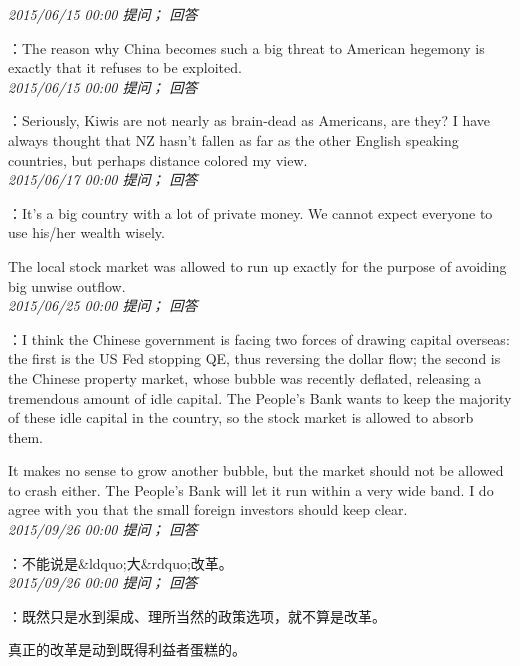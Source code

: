 \documentclass[twocolumn]{ctexart}
\begin{document}
\textit{\hfill\noindent\small 2015/06/15 00:00 提问； 回答}

：The reason why China becomes such a big threat to American hegemony is exactly that it refuses to be exploited.\\

\textit{\hfill\noindent\small 2015/06/15 00:00 提问； 回答}

：Seriously, Kiwis are not nearly as brain-dead as Americans, are they? I have always thought that NZ hasn't fallen as far as the other English speaking countries, but perhaps distance colored my view.\\

\textit{\hfill\noindent\small 2015/06/17 00:00 提问； 回答}

：It's a big country with a lot of private money. We cannot expect everyone to use his/her wealth wisely.

The local stock market was allowed to run up exactly for the purpose of avoiding big unwise outflow.\\

\textit{\hfill\noindent\small 2015/06/25 00:00 提问； 回答}

：I think the Chinese government is facing two forces of drawing capital overseas: the first is the US Fed stopping QE, thus reversing the dollar flow; the second is the Chinese property market, whose bubble was recently deflated, releasing a tremendous amount of idle capital. The People's Bank wants to keep the majority of these idle capital in the country, so the stock market is allowed to absorb them.

It makes no sense to grow another bubble, but the market should not be allowed to crash either. The People's Bank will let it run within a very wide band. I do agree with you that the small foreign investors should keep clear.
\\

\textit{\hfill\noindent\small 2015/09/26 00:00 提问； 回答}

：不能说是\&ldquo;大\&rdquo;改革。\\

\textit{\hfill\noindent\small 2015/09/26 00:00 提问； 回答}

：既然只是水到渠成、理所当然的政策选项，就不算是改革。

真正的改革是动到既得利益者蛋糕的。\\
\end{document}
